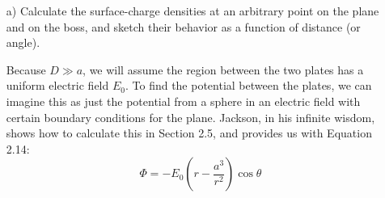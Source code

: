 \documentclass[a4paper,twoside]{article}
\begin{document}
\begin{itemize}
    \item[a)] Calculate the surface-charge densities at an arbitrary point on the plane and on the boss, and sketch their behavior as a function of distance (or angle).

        \begin{tcolorbox}[breakable]
    Because $D\gg a$, we will assume the region between the two plates has a uniform electric field $E_0$. To find the potential between the plates, we can imagine this as just the potential from a sphere in an electric field with certain boundary conditions for the plane. Jackson, in his infinite wisdom, shows how to calculate this in Section 2.5, and provides us with Equation 2.14:
    \begin{equation}
        \Phi = -E_0\left( r - \frac{a^3}{r^2} \right) \cos\theta
    \end{equation}


\end{tcolorbox}
\end{itemize}
\end{document}
